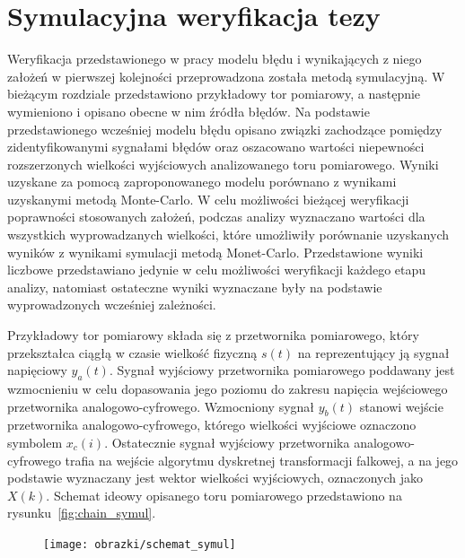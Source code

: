 \chapter{Symulacyjna weryfikacja tezy}

Weryfikacja przedstawionego w pracy modelu błędu i wynikających z niego założeń w pierwszej kolejności przeprowadzona została metodą symulacyjną. W bieżącym rozdziale przedstawiono przykładowy tor pomiarowy, a następnie wymieniono i opisano obecne w nim źródła błędów. Na podstawie przedstawionego wcześniej modelu błędu opisano związki zachodzące pomiędzy zidentyfikowanymi sygnałami błędów oraz oszacowano wartości niepewności rozszerzonych wielkości wyjściowych analizowanego toru pomiarowego. Wyniki uzyskane za pomocą zaproponowanego modelu porównano z wynikami uzyskanymi metodą Monte-Carlo. W celu możliwości bieżącej weryfikacji poprawności stosowanych założeń, podczas analizy wyznaczano wartości dla wszystkich wyprowadzanych wielkości, które umożliwiły porównanie uzyskanych wyników z wynikami symulacji metodą Monet-Carlo. Przedstawione wyniki liczbowe przedstawiano jedynie w celu możliwości weryfikacji każdego etapu analizy, natomiast ostateczne wyniki wyznaczane były na podstawie wyprowadzonych wcześniej zależności.

Przykładowy tor pomiarowy składa się z przetwornika pomiarowego, który przekształca ciągłą w czasie wielkość fizyczną $s(t)$ na reprezentujący ją sygnał napięciowy $y_{a}(t)$. Sygnał wyjściowy przetwornika pomiarowego poddawany jest wzmocnieniu w celu dopasowania jego poziomu do zakresu napięcia wejściowego przetwornika analogowo-cyfrowego. Wzmocniony sygnał $y_{b}(t)$ stanowi wejście przetwornika analogowo-cyfrowego, którego wielkości wyjściowe oznaczono symbolem $x_{c}(i)$. Ostatecznie sygnał wyjściowy przetwornika analogowo-cyfrowego trafia na wejście algorytmu dyskretnej transformacji falkowej, a na jego podstawie wyznaczany jest wektor wielkości wyjściowych, oznaczonych jako $X(k)$. Schemat ideowy opisanego toru pomiarowego przedstawiono na rysunku~\ref{fig:chain_symul}.

\begin{figure}[htb!]
\begin{center}
\texttt{[image: obrazki/schemat\_symul]}
\end{center}
\end{figure}

